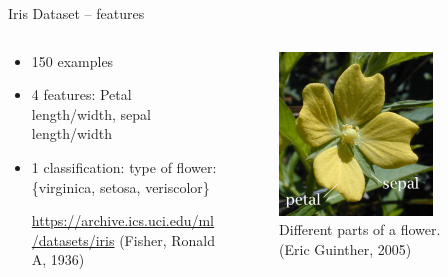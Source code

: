 \documentclass[10pt]{beamer}
\begin{document}
\begin{frame}[label={sec:org0226960}]{Iris Dataset -- features}
\begin{columns}
\begin{column}{0.5\columnwidth}
\begin{itemize}
\item 150 examples
\item 4 features: Petal length/width, sepal length/width
\item 1 classification: type of flower: \{virginica, setosa, veriscolor\}

\url{https://archive.ics.uci.edu/ml/datasets/iris}
(Fisher, Ronald A, 1936)
\end{itemize}
\end{column}

\begin{column}{0.4\columnwidth}
\begin{figure}[htbp]
\centering
\includegraphics[width=0.8\textwidth]{images/Petal-sepal.jpg}
\caption{Different parts of a flower. (Eric Guinther, 2005)}
\end{figure}
\end{column}
\end{columns}
\end{frame}
\end{document}
